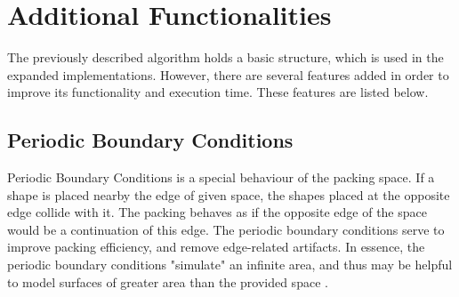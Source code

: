 \documentclass[12pt, oneside]{report}
\begin{document}
\section {Additional Functionalities}

The previously described algorithm holds a basic structure, which is used in the expanded implementations. However, there are several features added in order to improve its functionality and execution time. These features are listed below.

\subsection{Periodic Boundary Conditions}

Periodic Boundary Conditions is a special behaviour of the packing space. If a shape is placed nearby the edge of given space, the shapes placed at the opposite edge collide with it. The packing behaves as if the opposite edge of the space would be a continuation of this edge. The periodic boundary conditions serve to improve packing efficiency, and remove edge-related artifacts. In essence, the periodic boundary conditions "simulate" an infinite area, and thus may be helpful to model surfaces of greater area than the provided space \cite{ciesla_mziff}.
\end{document}
